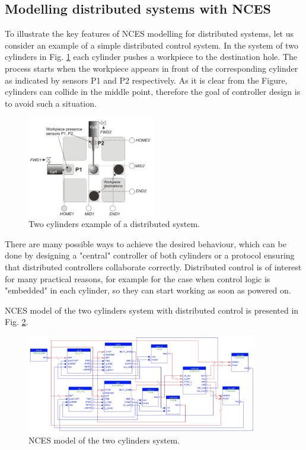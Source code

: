 \begin{bibunit}
\section{Modelling distributed systems with NCES}\label{sec:ncesmod}

To illustrate the key features of NCES modelling for distributed systems, let us consider an example of a simple distributed control system. In the system of two cylinders in Fig. \ref{fig:two_cylinders} each cylinder pushes a workpiece to the destination hole. The process starts when the workpiece appears in front of the corresponding cylinder as indicated by sensors P1 and P2 respectively. 
As it is clear from the Figure, cylinders can collide in the middle point, therefore the goal of controller design is to avoid such a situation. 

\begin{figure}
    \centering
    \includegraphics[width=0.5\textwidth]{MX_Papers/Paper1/images/two_cylinders.jpg}
    \caption{Two cylinders example of a distributed system.}
    \label{fig:two_cylinders}
\end{figure}

There are many possible ways to achieve the desired behaviour, which can be done by designing a "central" controller of both cylinders or a protocol ensuring that distributed controllers collaborate correctly. Distributed control is of interest for many practical reasons, for example for the case when control logic is "embedded" in each cylinder, so they can start working as soon as powered on.

NCES model of the two cylinders system with distributed control is presented in Fig. \ref{fig:nces_2_cyl}.

\begin{figure}
    \centering
    \includegraphics[width=0.9\textwidth]{MX_Papers/Paper1/images/nces_two_cylinders.jpg}
    \caption{NCES model of the two cylinders system.}
    \label{fig:nces_2_cyl}
\end{figure}


\end{bibunit}
